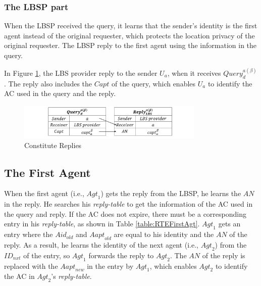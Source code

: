 \documentclass[conference]{IEEEtran}
\begin{document}
\subsubsection{ The LBSP part}

\noindent When the LBSP received the query, it learns that the sender's identity is the first agent instead of the original requester, which protects the location privacy of the original requester. The LBSP reply to the first agent using the information in the query.

In Figure \ref{fig:ConstituteReplies}, the LBS provider reply to the sender $U_a$, when it receives ${Query}^{a\left(\beta\right)}_d$. The reply also includes the $Capt$ of the query, which enables $U_a$ to identify the AC used in the query and the reply.

\begin{figure} [H]
  \centering 
  \includegraphics[width=3.5in]{figures/FIG_4_6_Constitute_Replies.png}
  \caption{Constitute Replies} 
  \label{fig:ConstituteReplies} %
\end{figure}

\subsection{ The First Agent}

\noindent When the first agent (i.e., ${Agt}_1$) gets the reply from the LBSP, he learns the $AN$ in the reply. He searches his \textit{reply-table} to get the information of the AC used in the query and reply. If the AC does not expire, there must be a corresponding entry in his \textit{reply-table}, as shown in Table \ref{table:RTEFirstAgt}. ${Agt}_1$ gets an entry where the $Aid_{old}$ and ${Aapt}_{old}$ are equal to his identity and the $AN$ of the reply. As a result, he learns the identity of the next agent (i.e., ${Agt}_2$) from the ${ID}_{nxt}$ of the entry, so ${Agt}_1$ forwards the reply to ${Agt}_2$. The $AN$ of the reply is replaced with the ${Aapt}_{new}$ in the entry by ${Agt}_1$, which enables ${Agt}_2$ to identify the AC in ${Agt}_2$'s \textit{reply-table}.
\end{document}

